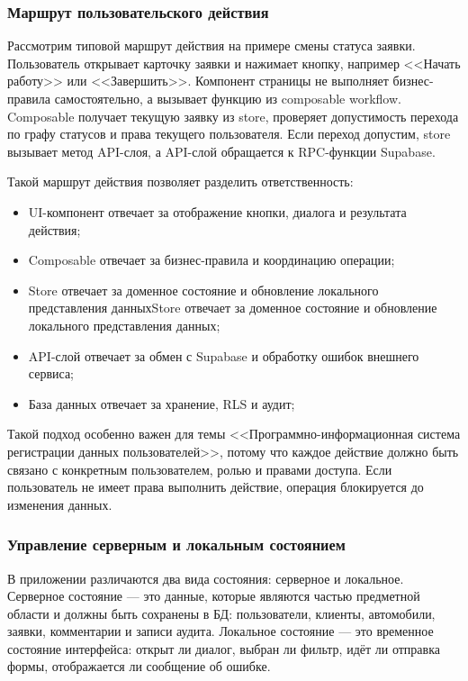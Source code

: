 \subsubsection{Маршрут пользовательского действия}

Рассмотрим типовой маршрут действия на примере смены статуса заявки. Пользователь открывает карточку заявки и нажимает кнопку, например <<Начать работу>> или <<Завершить>>. Компонент страницы не выполняет бизнес-правила самостоятельно, а вызывает функцию из composable workflow. Composable получает текущую заявку из store, проверяет допустимость перехода по графу статусов и права текущего пользователя. Если переход допустим, store вызывает метод API-слоя, а API-слой обращается к RPC-функции Supabase.

Такой маршрут действия позволяет разделить ответственность:

\begin{itemize}
	\item UI-компонент отвечает за отображение кнопки, диалога и результата действия;
	\item Composable отвечает за бизнес-правила и координацию операции;
	\item Store отвечает за доменное состояние и обновление локального представления данныхStore отвечает за доменное состояние и обновление локального представления данных;
	\item API-слой отвечает за обмен с Supabase и обработку ошибок внешнего сервиса;
	\item База данных отвечает за хранение, RLS и аудит;
\end{itemize}

Такой подход особенно важен для темы <<Программно-информационная система регистрации данных пользователей>>, потому что каждое действие должно быть связано с конкретным пользователем, ролью и правами доступа. Если пользователь не имеет права выполнить действие, операция блокируется до изменения данных.

\subsubsection{Управление серверным и локальным состоянием}

В приложении различаются два вида состояния: серверное и локальное. Серверное состояние — это данные, которые являются частью предметной области и должны быть сохранены в БД: пользователи, клиенты, автомобили, заявки, комментарии и записи аудита. Локальное состояние — это временное состояние интерфейса: открыт ли диалог, выбран ли фильтр, идёт ли отправка формы, отображается ли сообщение об ошибке.

